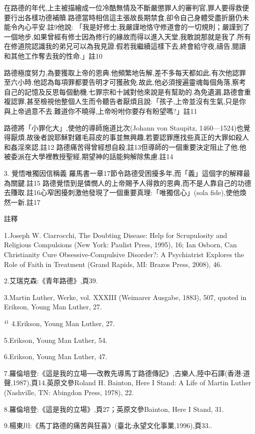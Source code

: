 \documentclass{book}
\begin{document}
在路德的年代,上主被描繪成一位冷酷無情及不斷嚴懲罪人的審判官,罪人要得救便要行出各樣功德補贖.路德當時相信這主張故長期禁食,卻令自己身體受盡折磨仍未能令內心平安.註9他說:
「我是好修士,我嚴謹地恪守修道會的一切規則；嚴謹到了一個地步,如果曾經有修士因為修行的緣故而得以進入天堂,我敢說那就是我了.所有在修道院認識我的弟兄可以為我見證.假若我繼續這樣下去,終會給守夜,禱告,閱讀和其他工作奪去我的性命.」註10

路德極度努力,為要獲取上帝的恩典.他頻繁地告解,差不多每天都如此.有次他認罪至六小時.他認為每項罪都要告明才可獲赦免.故此,他必須搜遍靈魂每個角落,察考自己的記憶及反思每個動機.七罪宗和十誡對他來說是有幫助的.為免遺漏,路德會重複認罪,甚至檢視他整個人生而令聽告者厭煩且說:「孩子,上帝並沒有生氣,只是你與上帝過意不去.難道你不曉得,上帝吩咐你要存有盼望嗎?」註11

路德將「小罪化大」,使他的導師施道比次(Johann von Staupitz, 1460—1524)也覺得厭煩,故後者說耶穌對雞毛蒜皮的事並無興趣,若要認罪應找些真正的大罪如殺人和姦淫來認.註12 路德痛苦得曾經想自殺,註13但導師的一個重要決定阻止了他.他被委派在大學裡教授聖經,期望神的話能夠解除焦慮.註14

3. 覺悟唯獨因信稱義
羅馬書一章17節令路德受困擾多年,而「義」這個字的解釋最為關鍵.註15 路德覺悟到是憐憫人的上帝賜予人得救的恩典,而不是人靠自己的功德去賺取.註16心窄困擾刺激他發現了一個重要真理:「唯獨信心」(sola fide),使他煥然一新.註17

註釋

1.Joseph W. Ciarrocchi, The Doubting Disease: Help for Scrupulosity and Religious Compulsions (New York: Paulist Press, 1995), 16; Ian Osborn, Can Christianity Cure Obsessive-Compulsive Disorder?: A Psychiatrist Explores the Role of Faith in Treatment (Grand Rapids, MI: Brazos Press, 2008), 46.

2.艾瑞克森:《青年路德》,頁39.

3.Martin Luther, Werke, vol. XXXIII (Weimarer Ausgabe, 1883), 507, quoted in Erikson, Young Man Luther, 27.

$^{41}$
4.Erikson, Young Man Luther, 27.

5.Erikson, Young Man Luther, 54.

6.Erikson, Young Man Luther, 47.

7.羅倫培登:《這是我的立場──改教先導馬丁路德傳記》,古樂人,陸中石譯(香港:道聲,1987),頁14.英原文參Roland H. Bainton, Here I Stand: A Life of Martin Luther (Nashville, TN: Abingdon Press, 1978), 22.

8.羅倫培登:《這是我的立場》,頁27；英原文參Bainton, Here I Stand, 31.

9.楊東川:《馬丁路德的痛苦與狂喜》(臺北:永望文化事業,1996),頁33..
\end{document}

